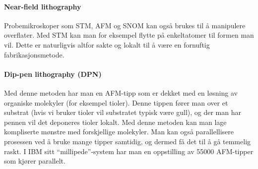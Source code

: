 \paragraph{Near-field lithography} Probemikroskoper som STM, AFM og SNOM kan også brukes til å manipulere overflater. Med STM kan man for eksempel flytte på enkeltatomer til formen man vil. Dette er naturligvis altfor sakte og lokalt til å være en fornuftig fabrikasjonsmetode.

\paragraph{Dip-pen lithography (DPN)} Med denne metoden har man en AFM-tipp som er dekket med en løsning av organiske molekyler (for eksempel tioler). Denne tippen fører man over et substrat (hvis vi bruker tioler vil substratet typisk være gull), og der man har pennen vil det deponeres tioler lokalt. Med denne metoden kan man lage kompliserte mønstre med forskjellige molekyler. Man kan også parallellisere prosessen ved å bruke mange tipper samtidig, og dermed få det til å gå temmelig raskt. I IBM sitt ``millipede''-system har man en oppstilling av 55000 AFM-tipper som kjører parallelt. 
